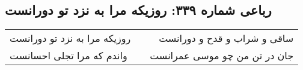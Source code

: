\begin{center}
\section*{رباعی شماره ۳۳۹: روزیکه مرا به نزد تو دورانست}
\label{sec:0339}
\begin{longtable}{l p{0.5cm} r}
روزیکه مرا به نزد تو دورانست
&&
ساقی و شراب و قدح و دورانست
\\
واندم که مرا تجلی احسانست
&&
جان در تن من چو موسی عمرانست
\\
\end{longtable}
\end{center}
